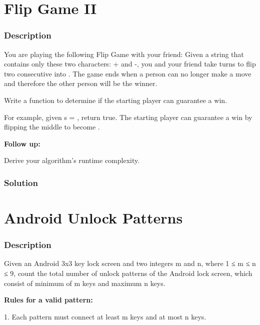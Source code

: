 \newpage

\section{Flip Game II} %
\subsubsection{Description}

You are playing the following Flip Game with your friend: Given a string that contains only these two characters: + and -, you and your friend take turns to flip two consecutive  into . The game ends when a person can no longer make a move and therefore the other person will be the winner.

Write a function to determine if the starting player can guarantee a win.

For example, given s = , return true. The starting player can guarantee a win by flipping the middle  to become .

\textbf{Follow up:}

Derive your algorithm's runtime complexity.

\subsubsection{Solution}

\begin{Code}

\end{Code}

\newpage

\section{Android Unlock Patterns} %
\subsubsection{Description}

Given an Android 3x3 key lock screen and two integers m and n, where 1 ≤ m ≤ n ≤ 9, count the total number of unlock patterns of the Android lock screen, which consist of minimum of m keys and maximum n keys.

\textbf{Rules for a valid pattern:}

1. Each pattern must connect at least m keys and at most n keys.

